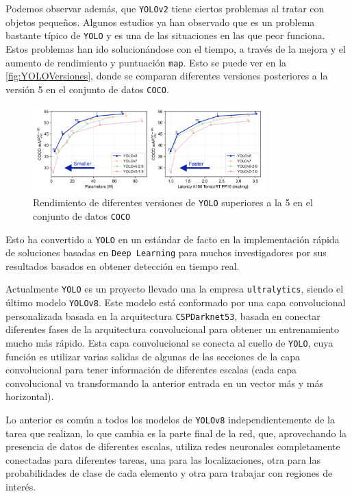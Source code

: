 Podemos observar además, que \texttt{YOLOv2} tiene ciertos problemas al tratar con objetos pequeños. Algunos estudios\cite{bhagyaOverviewDeepLearning2019} ya han observado que es un problema bastante típico de \texttt{YOLO} y es una de las situaciones en las que 
peor funciona.\newline
Estos problemas han ido solucionándose con el tiempo, a través de la mejora y el aumento de rendimiento y puntuación \texttt{\acrshort{map}}. Esto se puede ver en la \autoref{fig:YOLOVersiones}, donde se 
comparan diferentes versiones posteriores a la versión 5 en el conjunto de datos \texttt{COCO}.

\begin{figure}[H]
    \centering
    \includegraphics[width=0.8\textwidth]{images/4/YOLOVersiones.png}
    \caption{Rendimiento de diferentes versiones de \texttt{YOLO} superiores a la 5 en el conjunto de datos \texttt{COCO}\cite{ultralyticsYOLOv8}}
    \label{fig:YOLOVersiones}
\end{figure}

Esto ha convertido a \texttt{YOLO} en un estándar de facto en la implementación rápida de soluciones basadas en \texttt{Deep Learning} para muchos investigadores por sus resultados basados en obtener detección en tiempo real.

Actualmente \texttt{YOLO} es un proyecto llevado una la empresa \texttt{ultralytics}, siendo el último modelo \texttt{YOLOv8}. Este modelo está conformado por una capa convolucional personalizada basada en la 
arquitectura \texttt{CSPDarknet53}, basada en conectar diferentes fases de la arquitectura convolucional para obtener un entrenamiento mucho más rápido. Esta capa convolucional se conecta al cuello de \texttt{YOLO}, 
cuya función es utilizar varias salidas de algunas de las secciones de la capa convolucional para tener información de diferentes escalas (cada capa convolucional va transformando la anterior entrada en un vector más y más horizontal).

Lo anterior es común a todos los modelos de \texttt{YOLOv8} independientemente de la tarea que realizan, lo que cambia es la parte final de la red, que, aprovechando la presencia de datos de diferentes escalas, 
utiliza redes neuronales completamente conectadas para diferentes tareas, una para las localizaciones, otra para las probabilidades de clase de cada elemento y otra para trabajar con regiones de interés.

